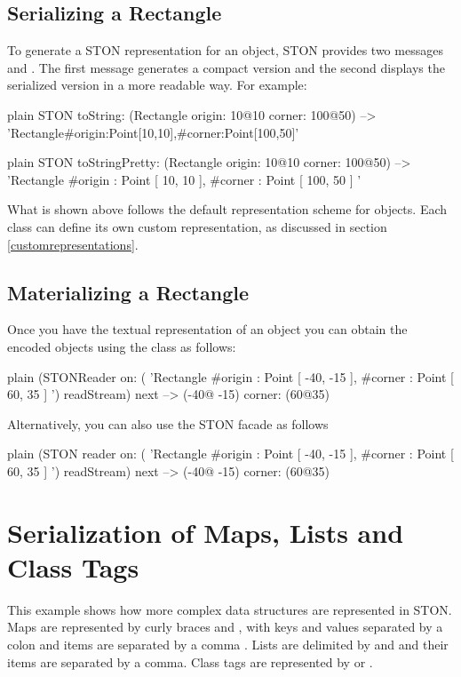 \documentclass[10pt,twoside,english]{_support/latex/sbabook/sbabook}
\begin{document}
\subsection{Serializing a Rectangle}
To generate a STON representation for an object, STON provides two messages  and . The first message generates a compact version
and the second displays the serialized version in a more readable way. For example:

\begin{displaycode}{plain}
STON toString: (Rectangle origin: 10@10 corner: 100@50)
   --> 'Rectangle{#origin:Point[10,10],#corner:Point[100,50]}'
\end{displaycode}

\begin{displaycode}{plain}
STON toStringPretty: (Rectangle origin: 10@10 corner: 100@50)
   -->
   'Rectangle {
      #origin : Point [ 10, 10 ],
      #corner : Point [ 100, 50 ]
   }'
\end{displaycode}

What is shown above follows the default representation scheme for objects. Each class can define its own custom representation, as discussed in section
\ref{customrepresentations}.
\subsection{Materializing a Rectangle}
Once you have the textual representation of an object you can obtain the encoded objects using the  class
as follows:

\begin{displaycode}{plain}
(STONReader on: ( 'Rectangle {
   #origin : Point [ -40, -15 ],
   #corner : Point [ 60, 35 ]
   }') readStream) next
   -->  (-40@ -15) corner: (60@35)
\end{displaycode}

Alternatively, you can also use the STON facade as follows

\begin{displaycode}{plain}
(STON reader on: ( 'Rectangle {
   #origin : Point [ -40, -15 ],
   #corner : Point [ 60, 35 ]
   }') readStream) next
   -->  (-40@ -15) corner: (60@35)
\end{displaycode}
\section{Serialization of Maps, Lists and Class Tags}
This example shows how more complex data structures are represented in STON.
Maps are represented by curly braces \textcode{\{} and \textcode{\}}, with keys and values separated by a colon \textcode{:} and items are separated by a comma \textcode{,} . Lists are
delimited by \textcode{{[}} and \textcode{{]}} and their items are separated by a comma. Class tags are represented by  or .
\end{document}

